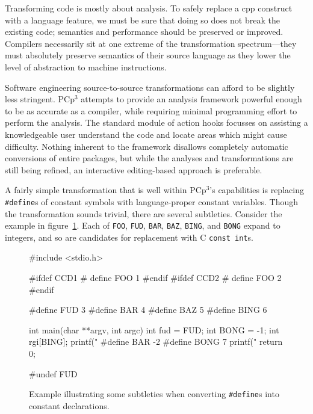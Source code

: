 \documentclass{article}
\newcommand{\pcp}{\mbox{\textsf{PCp}$^3$}}
\newcommand{\Cpp}{\mbox{\textsf{cpp}}}
\newcommand{\C}{\mbox{\textsf{C}}}
\newcommand{\ppd}[1]{\texttt{\##1}}
\begin{document}
Transforming code is mostly about analysis.  To safely replace a \Cpp{}
construct with a language feature, we must be sure that doing so does
not break the existing code;  semantics and performance should be
preserved or improved.  Compilers necessarily sit at one extreme of the
transformation spectrum---they must absolutely preserve semantics of
their source language as they lower the level of abstraction to machine
instructions.  

Software engineering source-to-source transformations can afford to be
slightly less stringent.  \pcp{} attempts to provide an analysis
framework powerful enough to be as accurate as a compiler, while
requiring minimal programming effort to perform the analysis.  The
standard module of action hooks focusses on assisting a knowledgeable
user understand the code and locate areas which might cause difficulty.
Nothing inherent to the framework disallows completely automatic
conversions of entire packages, but while the analyses and
transformations are still being refined, an interactive editing-based
approach is preferable.

A fairly simple transformation that is well within \pcp{}'s capabilities
is replacing \ppd{define}s of constant symbols with language-proper
constant variables.  Though the transformation sounds trivial, there are
several subtleties.  Consider the example in
figure~\ref{fig:def_example}.  Each of \texttt{FOO}, \texttt{FUD},
\texttt{BAR}, \texttt{BAZ}, \texttt{BING}, and \texttt{BONG} expand to
integers, and so are candidates for replacement with \C{} \texttt{const
  int}s.

\begin{figure}[hbt]
\begin{center}
\begin{small}
\begin{pseudocode}[5.5in]
#include <stdio.h>

#ifdef CCD1
#  define FOO 1
#endif
#ifdef CCD2
#  define FOO 2
#endif

#define FUD 3
#define BAR 4
#define BAZ 5
#define BING 6

int
main(char **argv, int argc)
{
  int fud = FUD;
  int BONG = -1;
  int rgi[BING];
  printf("%
#define BAR -2
#define BONG 7
  printf("%
  return 0;
}

#undef FUD
\end{pseudocode}
\end{small}
\caption{Example illustrating some subtleties when converting \ppd{define}s
  into constant declarations.}
\label{fig:def_example}
\end{center}
\end{figure}
\end{document}
